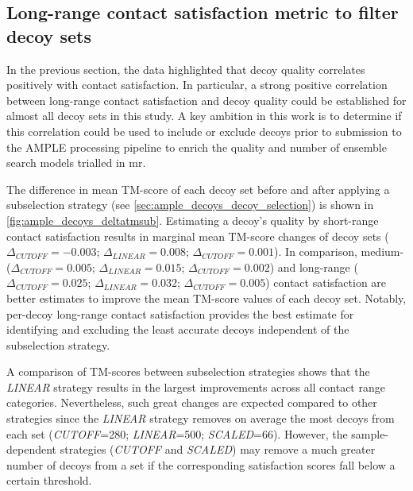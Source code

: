 
\subsection{Long-range contact satisfaction metric to filter decoy sets}
In the previous section, the data highlighted that decoy quality correlates positively with contact satisfaction. In particular, a strong positive correlation between long-range contact satisfaction and decoy quality could be established for almost all decoy sets in this study. A key ambition in this work is to determine if this correlation could be used to include or exclude decoys prior to submission to the AMPLE processing pipeline to enrich the quality and number of ensemble search models trialled in \gls{mr}.

The difference in mean TM-score of each decoy set before and after applying a subselection strategy (see \cref{sec:ample_decoys_decoy_selection}) is shown in \cref{fig:ample_decoys_deltatmsub}. Estimating a decoy's quality by short-range contact satisfaction results in marginal mean TM-score changes of decoy sets ($\Delta_{CUTOFF}=-0.003$; $\Delta_{LINEAR}=0.008$; $\Delta_{CUTOFF}=0.001$). In comparison, medium- ($\Delta_{CUTOFF}=0.005$; $\Delta_{LINEAR}=0.015$; $\Delta_{CUTOFF}=0.002$) and long-range ($\Delta_{CUTOFF}=0.025$; $\Delta_{LINEAR}=0.032$; $\Delta_{CUTOFF}=0.005$) contact satisfaction are better estimates to improve the mean TM-score values of each decoy set. Notably, per-decoy long-range contact satisfaction provides the best estimate for identifying and excluding the least accurate decoys independent of the subselection strategy. 

A comparison of \textDelta TM-scores between subselection strategies shows that the \textit{LINEAR} strategy results in the largest improvements across all contact range categories. Nevertheless, such great changes are expected compared to other strategies since the \textit{LINEAR} strategy removes on average the most decoys from each set (\textit{CUTOFF}=280; \textit{LINEAR}=500; \textit{SCALED}=66). However, the sample-dependent strategies (\textit{CUTOFF} and \textit{SCALED}) may remove a much greater number of decoys from a set if the corresponding satisfaction scores fall below a certain threshold.

